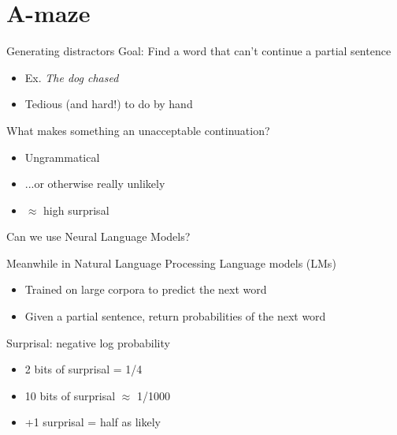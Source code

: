 \documentclass[ 12pt, xcolor=beamer,table,usenames,dvipsnames, ignorenonframetext, ngerman]{beamer}
\begin{document}
\section{A-maze}

\begin{frame}{Generating distractors}
	\pause
	Goal: Find a word that can't continue a partial sentence
	\begin{itemize}
		\item Ex.  \textit{The dog chased} \pause
		\item Tedious (and hard!) to do by hand
	\end{itemize} \pause
	
	What makes something an unacceptable continuation? \pause
	\begin{itemize}
		\item Ungrammatical \pause
		\item ...or otherwise really unlikely \pause 
		\item $\approx$ high surprisal 
	\end{itemize} \pause
	
	Can we use Neural Language Models?
\end{frame}

\begin{frame}{Meanwhile in Natural Language Processing}
\pause
Language models (LMs)
\begin{itemize}
	\item Trained on large corpora to predict the next word
	\item Given a partial sentence, return probabilities of the next word
\end{itemize}
Surprisal: negative log probability
\begin{itemize}
	\item 2 bits of surprisal = 1/4
	\item 10 bits of surprisal $\approx$ 1/1000 
	\item +1 surprisal = half as likely
\end{itemize}
\end{frame}
\end{document}
